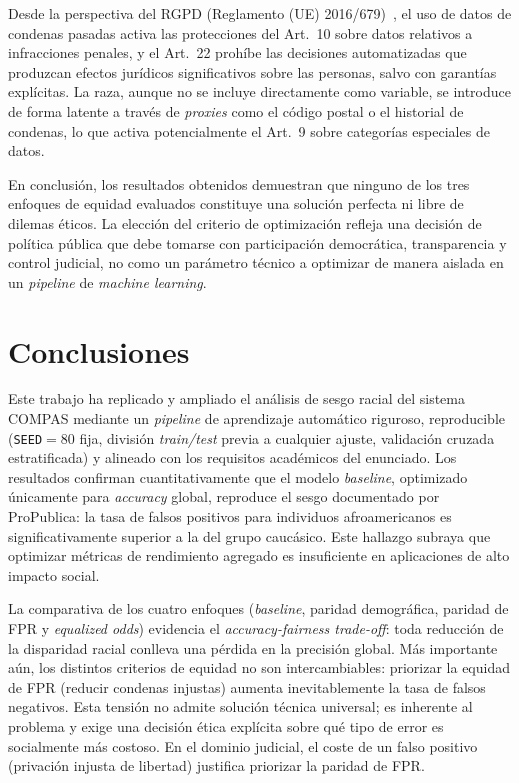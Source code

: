 \documentclass[11pt,a4paper]{article}
\begin{document}
Desde la perspectiva del RGPD (Reglamento (UE) 2016/679)~\cite{gdpr2016}, el uso de datos de condenas pasadas activa las protecciones del Art.~10 sobre datos relativos a infracciones penales, y el Art.~22 prohíbe las decisiones automatizadas que produzcan efectos jurídicos significativos sobre las personas, salvo con garantías explícitas. La raza, aunque no se incluye directamente como variable, se introduce de forma latente a través de \textit{proxies} como el código postal o el historial de condenas, lo que activa potencialmente el Art.~9 sobre categorías especiales de datos.

En conclusión, los resultados obtenidos demuestran que ninguno de los tres enfoques de equidad evaluados constituye una solución perfecta ni libre de dilemas éticos. La elección del criterio de optimización refleja una decisión de política pública que debe tomarse con participación democrática, transparencia y control judicial, no como un parámetro técnico a optimizar de manera aislada en un \textit{pipeline} de \textit{machine learning}.


\section{Conclusiones}
\label{sec:conclusiones}

Este trabajo ha replicado y ampliado el análisis de sesgo racial del sistema COMPAS mediante un \textit{pipeline} de aprendizaje automático riguroso, reproducible (\texttt{SEED}$=80$ fija, división \textit{train/test} previa a cualquier ajuste, validación cruzada estratificada) y alineado con los requisitos académicos del enunciado. Los resultados confirman cuantitativamente que el modelo \textit{baseline}, optimizado únicamente para \textit{accuracy} global, reproduce el sesgo documentado por ProPublica: la tasa de falsos positivos para individuos afroamericanos es significativamente superior a la del grupo caucásico. Este hallazgo subraya que optimizar métricas de rendimiento agregado es insuficiente en aplicaciones de alto impacto social.

La comparativa de los cuatro enfoques (\textit{baseline}, paridad demográfica, paridad de FPR y \textit{equalized odds}) evidencia el \textit{accuracy-fairness trade-off}: toda reducción de la disparidad racial conlleva una pérdida en la precisión global. Más importante aún, los distintos criterios de equidad no son intercambiables: priorizar la equidad de FPR (reducir condenas injustas) aumenta inevitablemente la tasa de falsos negativos. Esta tensión no admite solución técnica universal; es inherente al problema y exige una decisión ética explícita sobre qué tipo de error es socialmente más costoso. En el dominio judicial, el coste de un falso positivo (privación injusta de libertad) justifica priorizar la paridad de FPR.
\end{document}
